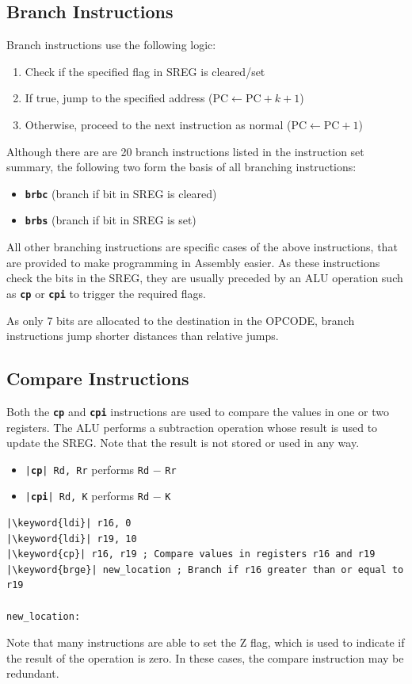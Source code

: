 \documentclass[a4paper]{report}
\newcommand{\keyword}[1]{\textcolor[rgb]{0.00,0.50,0.00}{\textbf{#1}}}
\newcommand{\keywordinline}[1]{\textcolor[rgb]{0.00,0.50,0.00}{\textbf{\texttt{#1}}}}
\begin{document}
\subsection{Branch Instructions}
Branch instructions use the following logic:
\begin{enumerate}
    \item Check if the specified flag in SREG is cleared/set
    \item If true, jump to the specified address (\(\mathrm{PC} \leftarrow \mathrm{PC} + k + 1\))
    \item Otherwise, proceed to the next instruction as normal (\(\mathrm{PC} \leftarrow \mathrm{PC} + 1\))
\end{enumerate}
Although there are are 20 branch instructions listed in the instruction set summary, the following two form the basis of all branching instructions:
\begin{itemize}
    \item \keywordinline{brbc} (branch if bit in SREG is cleared)
    \item \keywordinline{brbs} (branch if bit in SREG is set)
\end{itemize}
All other branching instructions are specific cases of the above instructions, that are provided to make programming in Assembly easier.
As these instructions check the bits in the SREG, they are usually preceded by an ALU operation such as \keywordinline{cp} or \keywordinline{cpi} to trigger the required flags.

As only 7 bits are allocated to the destination in the OPCODE, branch instructions jump shorter distances than relative jumps.
\subsection{Compare Instructions}
Both the \keywordinline{cp} and \keywordinline{cpi} instructions are used to compare the values in one or two registers.
The ALU performs a subtraction operation whose result is used to update the SREG\@. Note that the result is not stored or used in any way.
\begin{itemize}
    \item \texttt{|\keyword{cp}| Rd, Rr} performs \texttt{Rd} \(-\) \texttt{Rr}
    \item \texttt{|\keyword{cpi}| Rd, K} performs \texttt{Rd} \(-\) \texttt{K}
\end{itemize}
\begin{verbatim}
|\keyword{ldi}| r16, 0
|\keyword{ldi}| r19, 10
|\keyword{cp}| r16, r19 ; Compare values in registers r16 and r19
|\keyword{brge}| new_location ; Branch if r16 greater than or equal to r19

new_location:
\end{verbatim}
Note that many instructions are able to set the Z flag, which is used to indicate if the result of the operation is zero.
In these cases, the compare instruction may be redundant.
\end{document}
